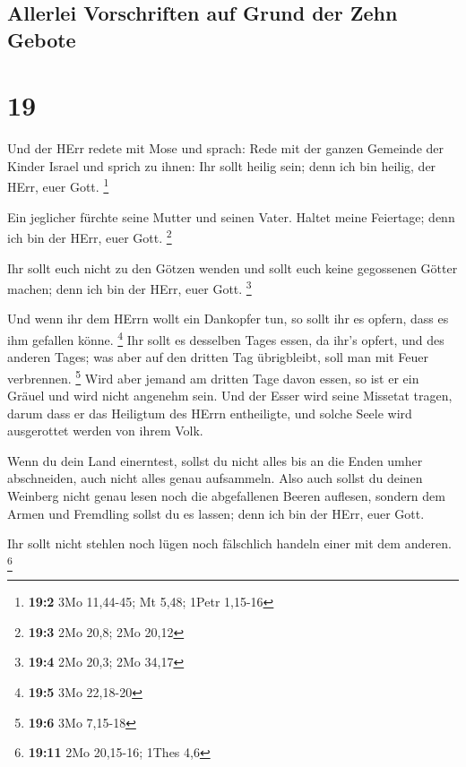 \hypertarget{allerlei-vorschriften-auf-grund-der-zehn-gebote}{%
\subsection{Allerlei Vorschriften auf Grund der Zehn
Gebote}\label{allerlei-vorschriften-auf-grund-der-zehn-gebote}}

\hypertarget{section-18}{%
\section{19}\label{section-18}}

 Und der HErr redete mit Mose und sprach: 
Rede mit der ganzen Gemeinde der Kinder Israel und sprich zu ihnen: Ihr
sollt heilig sein; denn ich bin heilig, der HErr, euer Gott. \footnote{\textbf{19:2}
  3Mo 11,44-45; Mt 5,48; 1Petr 1,15-16}

 Ein jeglicher fürchte seine Mutter und seinen Vater.
Haltet meine Feiertage; denn ich bin der HErr, euer Gott. \footnote{\textbf{19:3}
  2Mo 20,8; 2Mo 20,12}

 Ihr sollt euch nicht zu den Götzen wenden und sollt euch
keine gegossenen Götter machen; denn ich bin der HErr, euer Gott.
\footnote{\textbf{19:4} 2Mo 20,3; 2Mo 34,17}

 Und wenn ihr dem HErrn wollt ein Dankopfer tun, so sollt
ihr es opfern, dass es ihm gefallen könne. \footnote{\textbf{19:5} 3Mo
  22,18-20}  Ihr sollt es desselben Tages essen, da ihr's
opfert, und des anderen Tages; was aber auf den dritten Tag übrigbleibt,
soll man mit Feuer verbrennen. \footnote{\textbf{19:6} 3Mo 7,15-18}
 Wird aber jemand am dritten Tage davon essen, so ist er
ein Gräuel und wird nicht angenehm sein.  Und der Esser
wird seine Missetat tragen, darum dass er das Heiligtum des HErrn
entheiligte, und solche Seele wird ausgerottet werden von ihrem Volk.

 Wenn du dein Land einerntest, sollst du nicht alles bis
an die Enden umher abschneiden, auch nicht alles genau aufsammeln.
 Also auch sollst du deinen Weinberg nicht genau lesen
noch die abgefallenen Beeren auflesen, sondern dem Armen und Fremdling
sollst du es lassen; denn ich bin der HErr, euer Gott.

 Ihr sollt nicht stehlen noch lügen noch fälschlich
handeln einer mit dem anderen. \footnote{\textbf{19:11} 2Mo 20,15-16;
  1Thes 4,6}

